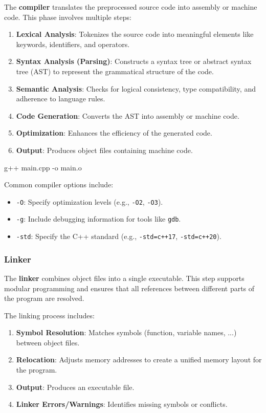     The \textbf{compiler} translates the preprocessed source code into assembly or machine code. This phase involves multiple steps:
    \begin{enumerate}
        \item \textbf{Lexical Analysis}: Tokenizes the source code into meaningful elements like keywords, identifiers, and operators.
        \item \textbf{Syntax Analysis (Parsing)}: Constructs a syntax tree or abstract syntax tree (AST) to represent the grammatical structure of the code.
        \item \textbf{Semantic Analysis}: Checks for logical consistency, type compatibility, and adherence to language rules.
        \item \textbf{Code Generation}: Converts the AST into assembly or machine code.
        \item \textbf{Optimization}: Enhances the efficiency of the generated code.
        \item \textbf{Output}: Produces object files containing machine code.
    \end{enumerate}
    
    \begin{codeblock}[language=bash]
g++ main.cpp -o main.o
    \end{codeblock}
    
    Common compiler options include:
    \begin{itemize}
        \item \texttt{-O}: Specify optimization levels (e.g., \texttt{-O2}, \texttt{-O3}).
        \item \texttt{-g}: Include debugging information for tools like \texttt{gdb}.
        \item \texttt{-std}: Specify the C++ standard (e.g., \texttt{-std=c++17}, \texttt{-std=c++20}).
    \end{itemize}

\subsubsection{Linker}
    
    The \textbf{linker} combines object files into a single executable. This step supports modular programming and ensures that all references between different parts of the program are resolved.
    
    The linking process includes:
    \begin{enumerate}
        \item \textbf{Symbol Resolution}: Matches symbols (function, variable names, ...) between object files.
        \item \textbf{Relocation}: Adjusts memory addresses to create a unified memory layout for the program.
        \item \textbf{Output}: Produces an executable file.
        \item \textbf{Linker Errors/Warnings}: Identifies missing symbols or conflicts.
    \end{enumerate}
    
